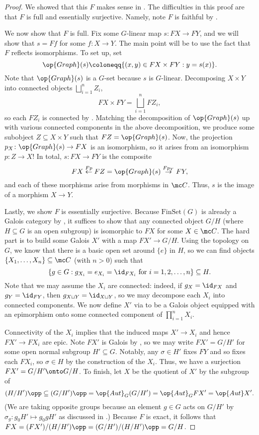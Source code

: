 \documentclass{amsart}
\begin{document}
\begin{proof}
    We showed that this $F$ makes sense in . The difficulties in this proof are that $F$ is full and essentially surjective. Namely, note $F$ is faithful by .

    We now show that $F$ is full. Fix some $G$-linear map $s\colon FX\to FY$, and we will show that $s=Ff$ for some $f\colon X\to Y$. The main point will be to use the fact that $F$ reflects isomorphisms. To set up, set
    \[\op{Graph}(s)\coloneqq\{(x,y)\in FX\times FY:y=s(x)\}.\]
    Note that $\op{Graph}(s)$ is a $G$-set because $s$ is $G$-linear. Decomposing $X\times Y$ into connected objects $\bigsqcup_{i=1}^nZ_i$,
    \[FX\times FY=\bigsqcup_{i=1}^nFZ_i,\]
    so each $FZ_i$ is connected by . Matching the decomposition of $\op{Graph}(s)$ up with various connected components in the above decomposition, we produce some subobject $Z\subseteq X\times Y$ such that $FZ=\op{Graph}(s)$. Now, the projection $p_X\colon\op{Graph}(s)\to FX$ is an isomorphism, so it arises from an isomorphism $p\colon Z\to X$! In total, $s\colon FX\to FY$ is the composite
    \[FX\stackrel{Fp}\leftarrow FZ=\op{Graph}(s)\stackrel{Fp_Y}\to FY,\]
    and each of these morphisms arise from morphisms in $\mc C$. Thus, $s$ is the image of a morphism $X\to Y$.

    Lastly, we show $F$ is essentially surjective. Because $\mathrm{FinSet}(G)$ is already a Galois category by , it suffices to show that any connected object $G/H$ (where $H\subseteq G$ is an open subgroup) is isomorphic to $FX$ for some $X\in\mc C$. The hard part is to build some Galois $X'$ with a map $FX'\to G/H$. Using the topology on $G$, we know that there is a basic open set around $\{e\}$ in $H$, so we can find objects $\{X_1,\ldots,X_n\}\subseteq\mc C$ (with $n>0$) such that
    \[\left\{g\in G:g_{X_i}=e_{X_i}={\id_{FX_i}}\text{ for }i=1,2,\ldots,n\right\}\subseteq H.\]
    Note that we may assume the $X_i$ are connected: indeed, if $g_X=\id_{FX}$ and $g_Y=\id_{FY}$, then $g_{X\sqcup Y}=\id_{X\sqcup Y}$, so we may decompose each $X_i$ into connected components. We now define $X'$ via  to be a Galois object equipped with an epimorphism onto some connected component of $\prod_{i=1}^nX_i$.
    
    Connectivity of the $X_i$ implies that the induced maps $X'\to X_i$ and hence $FX'\to FX_i$ are epic. Note $FX'$ is Galois by , so we may write $FX'=G/H'$ for some open normal subgroup $H'\subseteq G$. Notably, any $\sigma\in H'$ fixes $FY$ and so fixes each $FX_i$, so $\sigma\in H$ by the construction of the $X_i$. Thus, we have a surjection $FX'=G/H'\onto G/H$. To finish, let $X$ be the quotient of $X'$ by the subgroup of
    \[(H/H')\opp\subseteq(G/H')\opp=\op{Aut}_G(G/H')=\op{Aut}_GFX'=\op{Aut}X'.\]
    (We are taking opposite groups because an element $g\in G$ acts on $G/H'$ by $\sigma_g\colon g_0H'\mapsto g_0gH'$ as discussed in .) Because $F$ is exact, it follows that $FX=(FX')/(H/H')\opp=(G/H')/(H/H')\opp=G/H$.
\end{proof}
\end{document}
